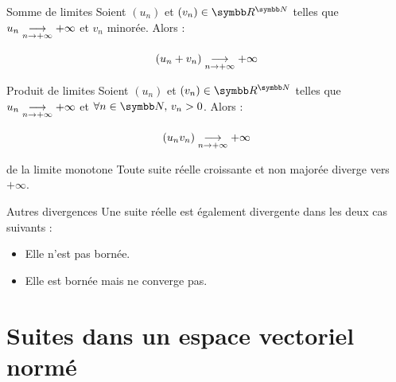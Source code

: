 \begin{theoreme}{Somme de limites}{}
    Soient $(u_n)$ et $(v_n) \in \R^{\N}$ telles que 
    $u_n \underset{n \to +\infty}{\longrightarrow} +\infty$ et $v_n$ minorée. Alors :

    \[(u_n + v_n) \underset{n \to +\infty}{\longrightarrow} +\infty\]
\end{theoreme}

\begin{theoreme}{Produit de limites}{}
    Soient $(u_n)$ et $(v_n) \in \R^{\N}$ telles que
    $u_n \underset{n \to +\infty}{\longrightarrow} +\infty$ et $\forall n \in \N, \, v_n > 0$. Alors :

    \[(u_n v_n) \underset{n \to +\infty}{\longrightarrow} +\infty\]
\end{theoreme}

\begin{theoreme}{de la limite monotone}{}
    Toute suite réelle croissante et non majorée diverge vers $+\infty$.
\end{theoreme}

\begin{definition}{Autres divergences}{}
    Une suite réelle est également divergente dans les deux cas suivants : 
    \begin{itemize}
        \item Elle n'est pas bornée. 
        \item Elle est bornée mais ne converge pas.
    \end{itemize}
\end{definition}

\section{Suites dans un espace vectoriel normé}
